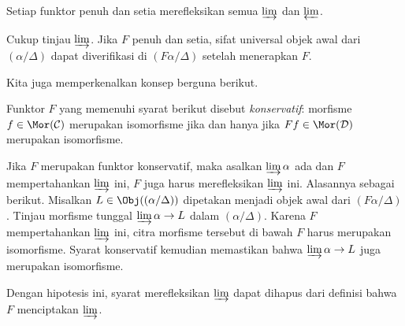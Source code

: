 \begin{proposisi}\label{prop:ff-reflect}
	Setiap funktor penuh dan setia merefleksikan semua $\varinjlim$ dan
	$\varprojlim$.
\end{proposisi}
\begin{bukti}
	Cukup tinjau $\varinjlim$. Jika $F$ penuh dan setia, sifat universal objek
	awal dari $(\alpha/\Delta)$ dapat diverifikasi di $(F\alpha/\Delta)$ setelah
	menerapkan $F$.
\end{bukti}

Kita juga memperkenalkan konsep berguna berikut.

\begin{definisi}\label{def:conservative}
	Funktor $F$ yang memenuhi syarat berikut disebut \emph{konservatif}:
	morfisme $f \in \Mor(\mathcal{C})$ merupakan isomorfisme jika dan hanya jika
	$Ff \in \Mor(\mathcal{D})$ merupakan isomorfisme.
\end{definisi}

\begin{catatan}\label{rem:conservative-reflect}
	Jika $F$ merupakan funktor konservatif, maka asalkan
	$\varinjlim \alpha$ ada dan $F$ mempertahankan $\varinjlim$ ini, $F$ juga
	harus merefleksikan $\varinjlim$ ini. Alasannya sebagai berikut. Misalkan
	$L \in \Obj((\alpha/\Delta))$ dipetakan menjadi objek awal dari
	$(F\alpha/\Delta)$. Tinjau morfisme tunggal
	$\varinjlim \alpha \to L$ dalam $(\alpha/\Delta)$. Karena $F$
	mempertahankan $\varinjlim$ ini, citra morfisme tersebut di bawah $F$
	harus merupakan isomorfisme. Syarat konservatif kemudian memastikan bahwa
	$\varinjlim \alpha \to L$ juga merupakan isomorfisme.

	Dengan hipotesis ini, syarat merefleksikan $\varinjlim$ dapat dihapus dari
	definisi bahwa $F$ menciptakan $\varinjlim$.
\end{catatan}

